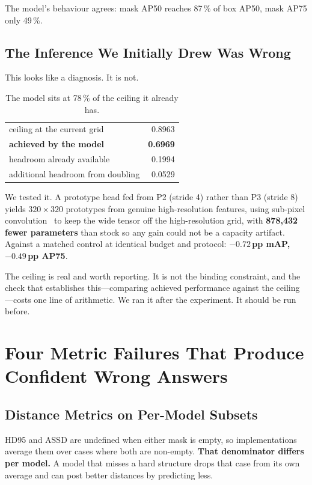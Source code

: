 \documentclass[10pt,twocolumn,letterpaper]{article}
\begin{document}
The model's behaviour agrees: mask AP50 reaches 87\,\% of box AP50, mask AP75
only 49\,\%.

\subsection{The Inference We Initially Drew Was Wrong}

This looks like a diagnosis. It is not.

\begin{table}[h]
\centering\small
\begin{tabular}{lr}
\toprule
ceiling at the current grid & 0.8963 \\
\textbf{achieved by the model} & \textbf{0.6969} \\
headroom already available & 0.1994 \\
additional headroom from doubling & 0.0529 \\
\bottomrule
\end{tabular}
\caption{The model sits at 78\,\% of the ceiling it already has.}
\end{table}

We tested it. A prototype head fed from P2 (stride 4) rather than P3 (stride 8)
yields $320\times320$ prototypes from genuine high-resolution features, using
sub-pixel convolution~\cite{shi2016subpixel} to keep the wide tensor off the
high-resolution grid, with \textbf{878{,}432 fewer parameters} than stock so any
gain could not be a capacity artifact. Against a matched control at identical
budget and protocol: \textbf{$-0.72$\,pp mAP, $-0.49$\,pp AP75}.

The ceiling is real and worth reporting. It is not the binding constraint, and
the check that establishes this---comparing achieved performance against the
ceiling---costs one line of arithmetic. We ran it after the experiment. It
should be run before.

\section{Four Metric Failures That Produce Confident Wrong Answers}

\subsection{Distance Metrics on Per-Model Subsets}

HD95 and ASSD are undefined when either mask is empty, so implementations
average them over cases where both are non-empty. \textbf{That denominator
differs per model.} A model that misses a hard structure drops that case from
its own average and can post better distances by predicting less.
\end{document}
